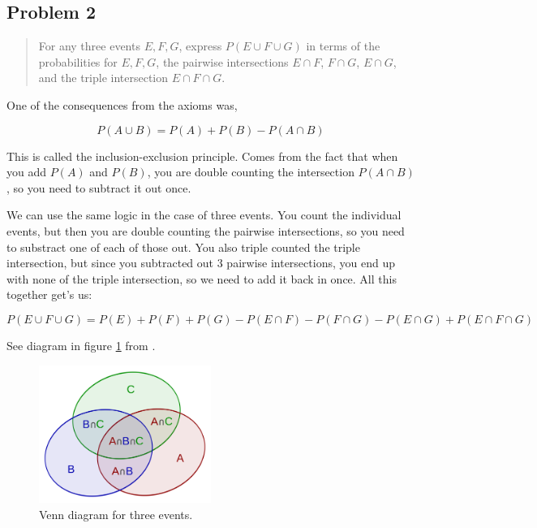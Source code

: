 \documentclass[10pt]{article}
\begin{document}
\subsection*{Problem 2}
\begin{quote}
	For any three events $E,F,G$, express $P(E\cup F\cup G)$ in terms of the probabilities for $E,F,G$, the pairwise intersections $E\cap F$, $F\cap G$, $E\cap G$, and the triple intersection $E\cap F\cap G$.
\end{quote}

\divider

One of the consequences from the axioms was,

\begin{equation}
	P(A \cup B) = P(A) + P(B) - P(A \cap B)
\end{equation}

This is called the inclusion-exclusion principle. Comes from the fact that when you add $P(A)$ and $P(B)$, you are double counting the intersection $P(A \cap B)$, so you need to subtract it out once.

We can use the same logic in the case of three events. You count the individual events, but then you are double counting the pairwise intersections, so you need to substract one of each of those out. You also triple counted the triple intersection, but since you subtracted out 3 pairwise intersections, you end up with none of the triple intersection, so we need to add it back in once. All this together get's us:

\begin{equation}
	P(E \cup F \cup G) = P(E) + P(F) + P(G) - P(E \cap F) - P(F \cap G) - P(E \cap G) + P(E \cap F \cap G)
\end{equation}

See diagram in figure \ref{fig:venn} from \cite{wiki:inclusion-exclusion}.

\begin{figure}
	\centering
	\includegraphics[width=0.5\textwidth]{Inclusion-exclusion.png}
	\caption{Venn diagram for three events.}
	\label{fig:venn}
\end{figure}
\end{document}
